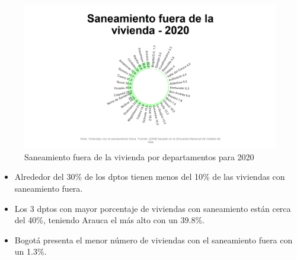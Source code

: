     \begin{figure}[H]
        \caption{Saneamiento fuera de la vivienda por departamentos para 2020 \label{map_result_2} }
        \begin{center}
        \includegraphics[width=\textwidth,keepaspectratio]{img/var_195_static.png}
        \end{center}
    \end{figure}
            \begin{itemize}
                    \item Alrededor del 30\% de los dptos tienen menos del 10\% de las viviendas con saneamiento fuera.
                    \item Los 3 dptos con mayor porcentaje de viviendas con saneamiento están cerca del 40\%, teniendo Arauca el más alto con un 39.8\%.
                    \item Bogotá presenta el menor número de viviendas con el saneamiento fuera con un 1.3\%.
                    \end{itemize}

